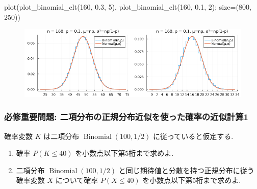 \documentclass[
  letterpaper,
  DIV=11,
  numbers=noendperiod]{scrartcl}
\newenvironment{Shaded}{\begin{snugshade}}{\end{snugshade}}
\newcommand{\FloatTok}[1]{\textcolor[rgb]{0.68,0.00,0.00}{#1}}
\newcommand{\FunctionTok}[1]{\textcolor[rgb]{0.28,0.35,0.67}{#1}}
\newcommand{\NormalTok}[1]{\textcolor[rgb]{0.00,0.23,0.31}{#1}}
\newcommand{\OperatorTok}[1]{\textcolor[rgb]{0.37,0.37,0.37}{#1}}
\begin{document}
\begin{Shaded}
\begin{Highlighting}[]
\FunctionTok{plot}\NormalTok{(}\FunctionTok{plot\_binomial\_clt}\NormalTok{(}\FloatTok{160}\NormalTok{, }\FloatTok{0.3}\NormalTok{, }\FloatTok{5}\NormalTok{), }\FunctionTok{plot\_binomial\_clt}\NormalTok{(}\FloatTok{160}\NormalTok{, }\FloatTok{0.1}\NormalTok{, }\FloatTok{2}\NormalTok{); size}\OperatorTok{=}\NormalTok{(}\FloatTok{800}\NormalTok{, }\FloatTok{250}\NormalTok{))}
\end{Highlighting}
\end{Shaded}

\begin{figure}[H]

{\centering \includegraphics{05 Central limit theorem_files/figure-pdf/cell-27-output-1.png}

}

\end{figure}

\hypertarget{ux5fc5ux4feeux91cdux8981ux554fux984c-ux4e8cux9805ux5206ux5e03ux306eux6b63ux898fux5206ux5e03ux8fd1ux4f3cux3092ux4f7fux3063ux305fux78baux7387ux306eux8fd1ux4f3cux8a08ux7b971}{%
\subsubsection{必修重要問題:
二項分布の正規分布近似を使った確率の近似計算1}\label{ux5fc5ux4feeux91cdux8981ux554fux984c-ux4e8cux9805ux5206ux5e03ux306eux6b63ux898fux5206ux5e03ux8fd1ux4f3cux3092ux4f7fux3063ux305fux78baux7387ux306eux8fd1ux4f3cux8a08ux7b971}}

確率変数 \(K\) は二項分布 \(\operatorname{Binomial}(100, 1/2)\)
に従っていると仮定する.

\begin{enumerate}
\def\labelenumi{(\arabic{enumi})}
\item
  確率 \(P(K \le 40)\) を小数点以下第5桁まで求めよ.
\item
  二項分布 \(\operatorname{Binomial}(100, 1/2)\)
  と同じ期待値と分散を持つ正規分布に従う確率変数 \(X\) について確率
  \(P(X \le 40)\) を小数点以下第5桁まで求めよ.
\end{enumerate}
\end{document}
